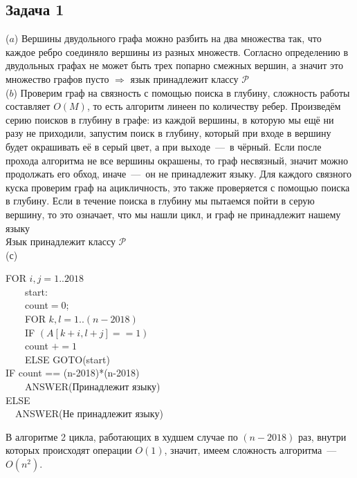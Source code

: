 \documentclass[12pt]{report}
\begin{document}
	\subsection*{Задача 1}
	($a$) Вершины двудольного графа можно разбить на два множества так, что каждое ребро соединяло вершины из разных множеств. Согласно определению в двудольных графах не может быть трех попарно смежных вершин, а значит это множество графов пусто $\Rightarrow$ язык принадлежит классу $\mathcal{P}$\\
	
	($b$) Проверим граф на связность с помощью поиска в глубину, сложность работы составляет $O(M)$, то есть алгоритм линеен по количеству ребер. Произведём серию поисков в глубину в графе: из каждой вершины, в которую мы ещё ни разу не приходили, запустим поиск в глубину, который при входе в вершину будет окрашивать её в серый цвет, а при выходе~---~в чёрный. Если после прохода алгоритма не все вершины окрашены, то граф несвязный, значит можно продолжать его обход, иначе~---~он не принадлежит языку. Для каждого связного куска проверим граф на ацикличность, это также проверяется с помощью поиска в глубину. Если в течение поиска в глубину мы пытаемся пойти в серую вершину, то это означает, что мы нашли цикл, и граф не принадлежит нашему языку\\
	Язык принадлежит классу $\mathcal{P}$\\
	
	(с)
	\begin{tabbing}
		FOR $i,j = 1..2018$\\	
		~~~~start:\\
		~~~~count$ = 0$;\\
		~~~~FOR $k,l = 1..(n - 2018)$\\
		~~~~IF $(A[k+i,l+j] == 1)$ \\
		~~~~count $+=1$ \\
		~~~~ELSE GOTO(start)\\
		IF count == (n-2018)*(n-2018)\\
		~~~~ANSWER(Принадлежит языку)\\
		ELSE\\
		~~ANSWER(Не принадлежит языку)\\
	\end{tabbing}
	В алгоритме 2 цикла, работающих в худшем случае по $(n-2018)$ раз, внутри которых происходят операции $O(1)$, значит, имеем сложность алгоритма~---~$O(n^2)$.
	\\
\end{document}
